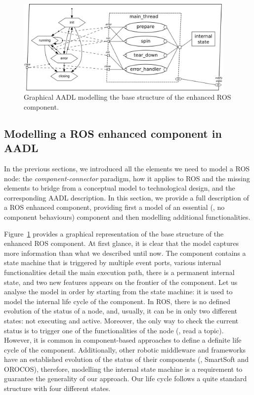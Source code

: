 \begin{figure}[t]
    \centering
    \includegraphics[width=0.95\textwidth]{gfx/essential}
    \caption{Graphical AADL modelling the base structure of the enhanced ROS component.}\label{fig:essential}
\end{figure}

\subsection{Modelling a ROS enhanced component in AADL}
\label{sec:ros-in-aadl}
In the previous sections, we introduced all the elements we need to model a ROS node: the \textit{component-connector} paradigm, how it applies to ROS and the missing elements to bridge from a conceptual model to technological design, and the corresponding AADL description. In this section, we provide a full description of a ROS enhanced component, providing first a model of an essential (\ie, no component behaviours) component and then modelling additional functionalities.

Figure~\ref{fig:essential} provides a graphical representation of the base structure of the enhanced ROS component. At first glance, it is clear that the model captures more information than what we described until now. The component contains a state machine that is triggered by multiple event ports, various internal functionalities detail the main execution path, there is a permanent internal state, and two new features appears on the frontier of the component. Let us analyse the model in order by starting from the state machine: it is used to model the internal life cycle of the component. In ROS, there is no defined evolution of the status of a node, and, usually, it can be in only two different states: not executing and active. Moreover, the only way to check the current status is to trigger one of the functionalities of the node (\eg, read a topic). However, it is common in component-based approaches to define a definite life cycle of the component. Additionally, other robotic middleware and frameworks have an established evolution of the status of their components (\eg, SmartSoft and OROCOS), therefore, modelling the internal state machine is a requirement to guarantee the generality of our approach. Our life cycle follows a quite standard structure with four different states.

